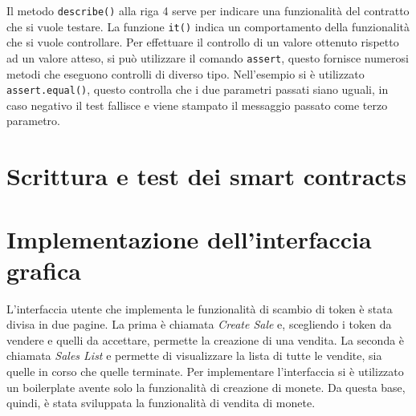 \documentclass[a4paper]{article}
\begin{document}
        Il metodo \verb|describe()| alla riga 4 serve per indicare una funzionalità del contratto che si vuole testare.
        La funzione \verb|it()| indica un comportamento della funzionalità che si vuole controllare.
        \newline
        Per effettuare il controllo di un valore ottenuto rispetto ad un valore atteso, si può utilizzare il comando \verb|assert|, questo fornisce numerosi metodi che eseguono controlli di diverso tipo.
        Nell'esempio si è utilizzato \verb|assert.equal()|, questo controlla che i due parametri passati siano uguali, in caso negativo il test fallisce e viene stampato il messaggio passato come terzo parametro.
        \newpage

        \section{Scrittura e test dei smart contracts}
        \newpage

        \section{Implementazione dell'interfaccia grafica}
        L'interfaccia utente che implementa le funzionalità di scambio di token è stata divisa in due pagine.
        La prima è chiamata \emph{Create Sale} e, scegliendo i token da vendere e quelli da accettare, permette
        la creazione di una vendita. La seconda è chiamata \emph{Sales List} e permette di visualizzare la lista di tutte le vendite, sia quelle in corso
        che quelle terminate.
        \newline
        Per implementare l'interfaccia si è utilizzato un boilerplate avente solo la funzionalità di creazione di monete\cite{boilerplate}. Da questa base, quindi, è stata sviluppata la funzionalità di vendita di monete. 
\end{document}
